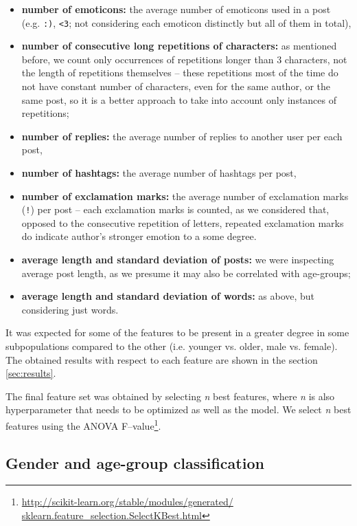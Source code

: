 \documentclass[10pt, a4paper]{article}
\begin{document}
\begin{itemize}
	\item \textbf{number of emoticons:} the average number of emoticons used in a post (e.g. \verb|:)|, \verb|<3|; not considering each emoticon distinctly but all of them in total),
	\item \textbf{number of consecutive long repetitions of characters:} as mentioned before, we count only occurrences of repetitions longer than 3 characters, not the length of repetitions themselves -- these repetitions most of the time do not have constant number of characters, even for the same author, or the same post, so it is a better approach to take into account only instances of repetitions;
	\item \textbf{number of replies:} the average number of replies to another user per each post,
	\item \textbf{number of hashtags:} the average number of hashtags per post,
	\item \textbf{number of exclamation marks:} the average number of exclamation marks (\verb|!|) per post -- each exclamation marks is counted, as we considered that, opposed to the consecutive repetition of letters, repeated exclamation marks do indicate author's stronger emotion to a some degree.
	\item \textbf{average length and standard deviation of posts:} we were inspecting average post length, as we presume it may also be correlated with age-groups;
	\item \textbf{average length and standard deviation of words:} as above, but considering just words.
\end{itemize}

It was expected for some of the features to be present in a greater degree in some subpopulations compared to the other (i.e. younger vs. older, male vs. female).
The obtained results with respect to each feature are shown in the section \ref{sec:results}.

The final feature set was obtained by selecting \textit{n} best features, where \textit{n} is also hyperparameter that needs to be optimized as well as the model.
We select \textit{n} best features using the ANOVA F--value\footnote{\url{http://scikit-learn.org/stable/modules/generated/
	sklearn.feature\_selection.SelectKBest.html}}.

\subsection{Gender and age-group classification}
\end{document}
